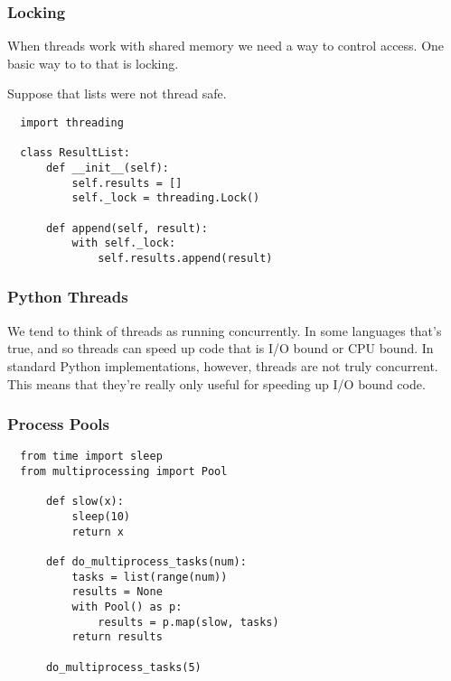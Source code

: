 \documentclass[10pt]{beamer}
\begin{document}
\begin{frame}[fragile]
  \frametitle{Locking}
  
  When threads work with shared memory we need a way to control access.
  One basic way to to that is locking.
  
  Suppose that lists were not thread safe.
  \begin{verbatim}
  import threading
  
  class ResultList:
      def __init__(self):
          self.results = []
          self._lock = threading.Lock()
          
      def append(self, result):
          with self._lock:
              self.results.append(result)   
  \end{verbatim}
\end{frame}

\begin{frame}
  \frametitle{Python Threads}
  
  We tend to think of threads as running concurrently. In some languages that's
  true, and so threads can speed up code that is I/O bound or CPU bound. In standard
  Python implementations, however, threads are not truly concurrent. This means that
  they're really only useful for speeding up I/O bound code.
  
\end{frame}

\begin{frame}[fragile]
  \frametitle{Process Pools}
  
  \begin{verbatim}
  from time import sleep
  from multiprocessing import Pool
  
      def slow(x):
          sleep(10)
          return x
          
      def do_multiprocess_tasks(num):
          tasks = list(range(num))
          results = None
          with Pool() as p:
              results = p.map(slow, tasks)
          return results
              
      do_multiprocess_tasks(5)  
  \end{verbatim} 
  
\end{frame}
\end{document}
